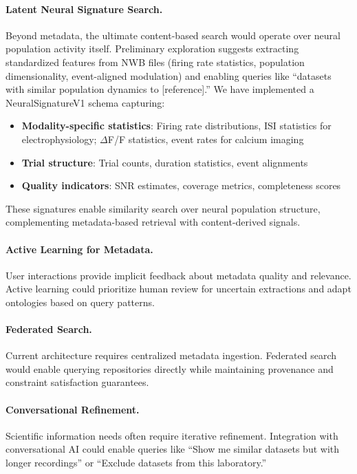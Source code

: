\documentclass{article}
\theoremstyle{definition}
\begin{document}
\paragraph{Latent Neural Signature Search.} Beyond metadata, the ultimate content-based search would operate over neural population activity itself. Preliminary exploration suggests extracting standardized features from NWB files (firing rate statistics, population dimensionality, event-aligned modulation) and enabling queries like ``datasets with similar population dynamics to [reference].'' We have implemented a NeuralSignatureV1 schema capturing:
\begin{itemize}
    \item \textbf{Modality-specific statistics}: Firing rate distributions, ISI statistics for electrophysiology; $\Delta$F/F statistics, event rates for calcium imaging
    \item \textbf{Trial structure}: Trial counts, duration statistics, event alignments
    \item \textbf{Quality indicators}: SNR estimates, coverage metrics, completeness scores
\end{itemize}
These signatures enable similarity search over neural population structure, complementing metadata-based retrieval with content-derived signals.

\paragraph{Active Learning for Metadata.} User interactions provide implicit feedback about metadata quality and relevance. Active learning could prioritize human review for uncertain extractions and adapt ontologies based on query patterns.

\paragraph{Federated Search.} Current architecture requires centralized metadata ingestion. Federated search would enable querying repositories directly while maintaining provenance and constraint satisfaction guarantees.

\paragraph{Conversational Refinement.} Scientific information needs often require iterative refinement. Integration with conversational AI could enable queries like ``Show me similar datasets but with longer recordings'' or ``Exclude datasets from this laboratory.''
\end{document}

